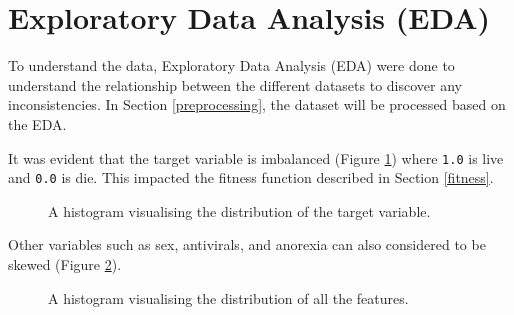 \documentclass{article}
\begin{document}
\section{Exploratory Data Analysis (EDA)}
\label{EDA}
To understand the data, Exploratory Data Analysis (EDA) were done to understand the relationship between the different datasets to discover any inconsistencies. In Section \ref{preprocessing}, the dataset will be processed based on the EDA.

It was evident that the target variable is imbalanced (Figure \ref{targetDist}) where \texttt{1.0} is live and \texttt{0.0} is die. This impacted the fitness function described in Section \ref{fitness}.

\begin{figure}[H]
  \caption{A histogram visualising the distribution of the target variable.}
  \label{targetDist}
\end{figure}

Other variables such as sex, antivirals, and anorexia can also considered to be skewed (Figure \ref{allDist}). 

\begin{figure}[H]
  \caption{A histogram visualising the distribution of all the features.}
  \label{allDist}
\end{figure}
\end{document}
